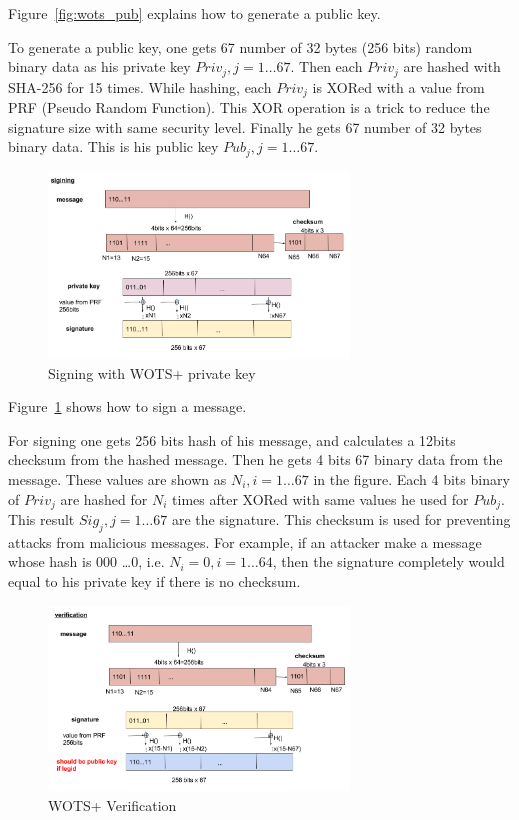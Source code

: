 \documentclass[a4paper,10pt,twocolumn]{article}
\begin{document}
 Figure~\ref{fig:wots_pub} explains how to generate a public key.

 To generate a public key, one gets 67 number of 32 bytes (256 bits) random binary data as his private key \( Priv_{j}, j=1 \ldots 67\).
 Then each \( Priv_{j} \) are hashed with SHA-256 for 15 times. While hashing, each  \( Priv_{j} \) is XORed with a value from PRF (Pseudo Random Function).
 This XOR operation is a trick to reduce the signature size with same security level.
 Finally he gets 67 number of 32 bytes binary data. This is his public key \( Pub_{j}, j=1 \ldots 67\).

 \begin{figure}[ht]
	\begin{center}
	\includegraphics[width=80mm]{wots_sign.png}
	  \caption{Signing with WOTS+ private key}
    \label{fig:wots_sign}
	\end{center}
 \end{figure}

 Figure~\ref{fig:wots_sign} shows  how to sign a message.

 For signing one gets 256 bits hash of his message, and calculates a 12bits checksum from the hashed message.
 Then he gets 4 bits 67 binary data from the message.
 These values are shown as \(N_i,i=1 \ldots 67\) in the figure. Each 4 bits binary of \( Priv_j \) are hashed for
 \(N_i\)  times after XORed with same values he used for \( Pub_{j} \). 
 This result \( Sig_j, j=1 \ldots 67 \) are the signature.
 This checksum is used for preventing attacks from malicious messages. For example, if an attacker make a message  whose hash is 000 \ldots 0,
 i.e. \( N_i = 0, i=1 \ldots 64 \), then the signature completely would equal to his private key if there is no checksum. 

 \begin{figure}[ht]
	\begin{center}
	\includegraphics[width=80mm]{wots_veri.png}
	  \caption{WOTS+ Verification }
    \label{fig:wots_veri}
	\end{center}
 \end{figure}
\end{document}
